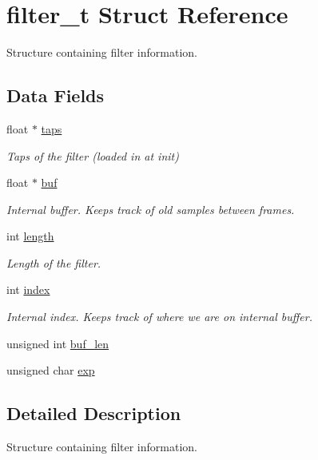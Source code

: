 \hypertarget{structfilter__t}{}\section{filter\+\_\+t Struct Reference}
\label{structfilter__t}


Structure containing filter information.  


\subsection*{Data Fields}
\begin{DoxyCompactItemize}
\item 
float $\ast$ \mbox{\hyperlink{structfilter__t_a4d1dbe72019d23a1c4cb7621cfb5f7c7}{taps}}
\begin{DoxyCompactList}\small\item\em Taps of the filter (loaded in at init) \end{DoxyCompactList}\item 
float $\ast$ \mbox{\hyperlink{structfilter__t_a3567b5dd3dc06bcee781721b50565213}{buf}}
\begin{DoxyCompactList}\small\item\em Internal buffer. Keeps track of old samples between frames. \end{DoxyCompactList}\item 
int \mbox{\hyperlink{structfilter__t_a8b47a8b9661b7ebcad76afd55452b992}{length}}
\begin{DoxyCompactList}\small\item\em Length of the filter. \end{DoxyCompactList}\item 
int \mbox{\hyperlink{structfilter__t_a858cfd81f33da9ad7c085aec0bea5693}{index}}
\begin{DoxyCompactList}\small\item\em Internal index. Keeps track of where we are on internal buffer. \end{DoxyCompactList}\item 
unsigned int \mbox{\hyperlink{structfilter__t_a97a989230be5b2e10eecc3de6b2c7dbb}{buf\+\_\+len}}
\item 
unsigned char \mbox{\hyperlink{structfilter__t_acf95f97baf83ef8bb108d8c9e51a0d8b}{exp}}
\end{DoxyCompactItemize}


\subsection{Detailed Description}
Structure containing filter information. 

